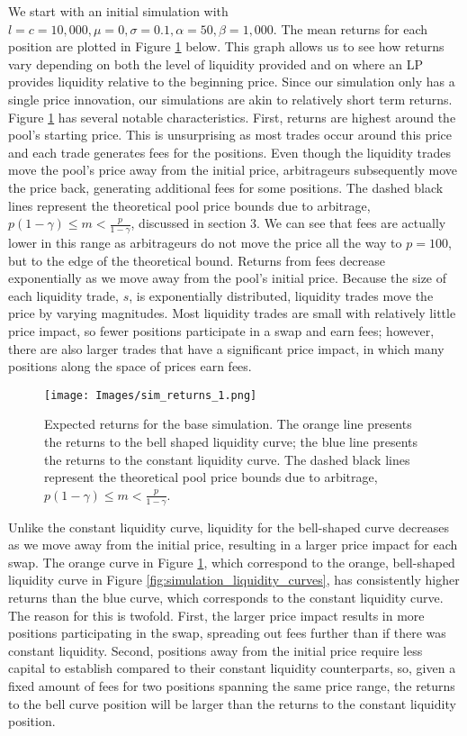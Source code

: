 \documentclass[11pt]{article}
\begin{document}
We start with an initial simulation with $l = c = 10,000, \mu = 0, \sigma = 0.1, \alpha = 50, \beta = 1,000$. The mean returns for each position are plotted in Figure \ref{fig:sim_returns_1} below. This graph allows us to see how returns vary depending on both the level of liquidity provided and on where an LP provides liquidity relative to the beginning price. Since our simulation only has a single price innovation, our simulations are akin to relatively short term returns. Figure \ref{fig:sim_returns_1} has several notable characteristics. First, returns are highest around the pool's starting price. This is unsurprising as most trades occur around this price and each trade generates fees for the positions. Even though the liquidity trades move the pool's price away from the initial price, arbitrageurs subsequently move the price back, generating additional fees for some positions. The dashed black lines represent the theoretical pool price bounds due to arbitrage, $p (1 - \gamma) \le m < \frac{p}{1 - \gamma}$, discussed in section 3. We can see that fees are actually lower in this range as arbitrageurs do not move the price all the way to $p = 100$, but to the edge of the theoretical bound. Returns from fees decrease exponentially as we move away from the pool's initial price. Because the size of each liquidity trade, $s$, is exponentially distributed, liquidity trades move the price by varying magnitudes. Most liquidity trades are small with relatively little price impact, so fewer positions participate in a swap and earn fees; however, there are also larger trades that have a significant price impact, in which many positions along the space of prices earn fees.

\begin{figure}[H]
    \centering
    \texttt{[image: Images/sim\_returns\_1.png]}
    \caption{Expected returns for the base simulation. The orange line presents the returns to the bell shaped liquidity curve; the blue line presents the returns to the constant liquidity curve. The dashed black lines represent the theoretical pool price bounds due to arbitrage, $p (1 - \gamma) \le m < \frac{p}{1 - \gamma}$.}
    \label{fig:sim_returns_1}
\end{figure}

Unlike the constant liquidity curve, liquidity for the bell-shaped curve decreases as we move away from the initial price, resulting in a larger price impact for each swap. The orange curve in Figure \ref{fig:sim_returns_1}, which correspond to the orange, bell-shaped liquidity curve in Figure \ref{fig:simulation_liquidity_curves}, has consistently higher returns than the blue curve, which corresponds to the constant liquidity curve. The reason for this is twofold. First, the larger price impact results in more positions participating in the swap, spreading out fees further than if there was constant liquidity. Second, positions away from the initial price require less capital to establish compared to their constant liquidity counterparts, so, given a fixed amount of fees for two positions spanning the same price range, the returns to the bell curve position will be larger than the returns to the constant liquidity position.
\end{document}
